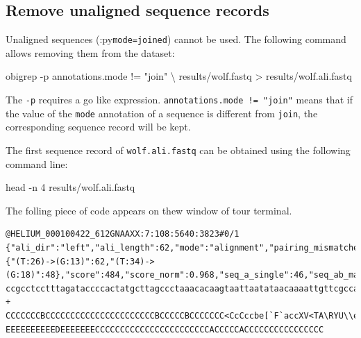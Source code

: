 \documentclass[
  letterpaper,
  DIV=11,
  numbers=noendperiod]{scrreprt}
\newenvironment{Shaded}{\begin{snugshade}}{\end{snugshade}}
\newcommand{\AttributeTok}[1]{\textcolor[rgb]{0.40,0.45,0.13}{#1}}
\newcommand{\DataTypeTok}[1]{\textcolor[rgb]{0.68,0.00,0.00}{#1}}
\newcommand{\ExtensionTok}[1]{\textcolor[rgb]{0.00,0.23,0.31}{#1}}
\newcommand{\FunctionTok}[1]{\textcolor[rgb]{0.28,0.35,0.67}{#1}}
\newcommand{\NormalTok}[1]{\textcolor[rgb]{0.00,0.23,0.31}{#1}}
\newcommand{\OperatorTok}[1]{\textcolor[rgb]{0.37,0.37,0.37}{#1}}
\newcommand{\StringTok}[1]{\textcolor[rgb]{0.13,0.47,0.30}{#1}}
\begin{document}
\hypertarget{remove-unaligned-sequence-records}{%
\subsection{Remove unaligned sequence
records}\label{remove-unaligned-sequence-records}}

Unaligned sequences (:py\texttt{mode=joined}) cannot be used. The
following command allows removing them from the dataset:

\begin{Shaded}
\begin{Highlighting}[]
\ExtensionTok{obigrep} \AttributeTok{{-}p} \StringTok{\textquotesingle{}annotations.mode != "join"\textquotesingle{}} \DataTypeTok{\textbackslash{}}
\NormalTok{        results/wolf.fastq }\OperatorTok{\textgreater{}}\NormalTok{ results/wolf.ali.fastq}
\end{Highlighting}
\end{Shaded}

The \texttt{-p} requires a go like expression.
\texttt{annotations.mode\ !=\ "join"} means that if the value of the
\texttt{mode} annotation of a sequence is different from \texttt{join},
the corresponding sequence record will be kept.

The first sequence record of \texttt{wolf.ali.fastq} can be obtained
using the following command line:

\begin{Shaded}
\begin{Highlighting}[]
\FunctionTok{head} \AttributeTok{{-}n}\NormalTok{ 4 results/wolf.ali.fastq}
\end{Highlighting}
\end{Shaded}

The folling piece of code appears on thew window of tour terminal.

\begin{verbatim}
@HELIUM_000100422_612GNAAXX:7:108:5640:3823#0/1 {"ali_dir":"left","ali_length":62,"mode":"alignment","pairing_mismatches":{"(T:26)->(G:13)":62,"(T:34)->(G:18)":48},"score":484,"score_norm":0.968,"seq_a_single":46,"seq_ab_match":60,"seq_b_single":46}
ccgcctcctttagataccccactatgcttagccctaaacacaagtaattaatataacaaaattgttcgccagagtactaccggcaatagcttaaaactcaaaggacttggcggtgctttatacccttctagaggagcctgttctaaggaggcgg
+
CCCCCCCBCCCCCCCCCCCCCCCCCCCCCCBCCCCCBCCCCCCC<CcCccbe[`F`accXV<TA\RYU\\ee_e[XZ[XEEEEEEEEEE?EEEEEEEEEEDEEEEEEECCCCCCCCCCCCCCCCCCCCCCCACCCCCACCCCCCCCCCCCCCCC
\end{verbatim}
\end{document}
